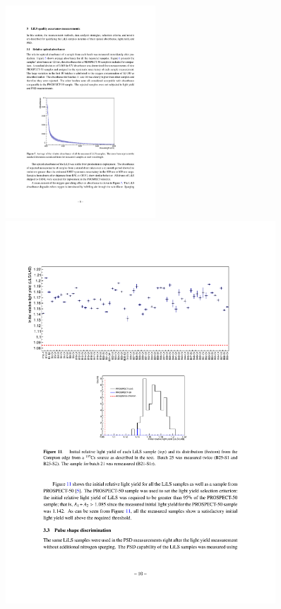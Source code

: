 \begin{figure}[h!]
    \centering
    \includegraphics[width=0.5\textwidth]{Figures/LSQA1.pdf}\\
    \includegraphics[width=0.9\textwidth]{Figures/LSQA2.pdf}\\

\end{figure}
